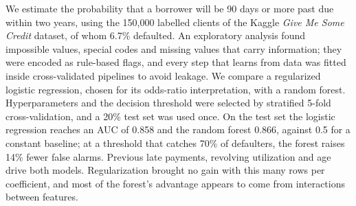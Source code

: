 We estimate the probability that a borrower will be 90 days or more past due
within two years, using the 150{,}000 labelled clients of the Kaggle
\emph{Give Me Some Credit} dataset, of whom 6.7\% defaulted. An exploratory
analysis found impossible values, special codes and missing values that carry
information; they were encoded as rule-based flags, and every step that learns
from data was fitted inside cross-validated pipelines to avoid leakage. We
compare a regularized logistic regression, chosen for its odds-ratio
interpretation, with a random forest. Hyperparameters and the decision
threshold were selected by stratified 5-fold cross-validation, and a 20\% test
set was used once. On the test set the logistic regression reaches an AUC of
0.858 and the random forest 0.866, against 0.5 for a constant baseline; at a
threshold that catches 70\% of defaulters, the forest raises 14\% fewer false
alarms. Previous late payments, revolving utilization and age drive both
models. Regularization brought no gain with this many rows per coefficient,
and most of the forest's advantage appears to come from interactions between
features.
